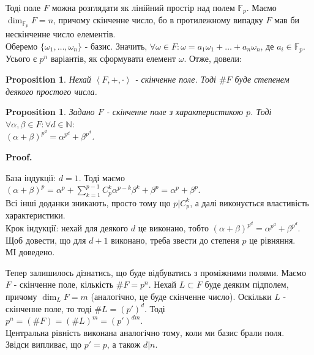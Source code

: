 \documentclass[a4paper, 10pt]{article}
\makeatletter
\theoremstyle{theoremdd}
\theoremstyle{theoremdd}
\theoremstyle{theoremdd}
\theoremstyle{theoremdd}
\theoremstyle{theoremdd}
\newtheorem{proposition}[theorem]{Proposition}
\theoremstyle{theoremdd}
\theoremstyle{theoremdd}
\theoremstyle{theoremdd}
\renewenvironment{proof}[1][Proof.\\]{\par
\pushQED{\hfill \qed}%
\normalfont \topsep6\p@\@plus6\p@\relax
\trivlist
\item\relax
{\bfseries
#1\@addpunct{.}}\hspace\labelsep\ignorespaces
}{%
\popQED\endtrivlist\@endpefalse
}
\makeatother
\begin{document}
Тоді поле $F$ можна розглядати як лінійний простір над полем $\mathbb{F}_p$.  Маємо $\dim_{\mathbb{F}_p} F = n$, причому скінченне число, бо в протилежному випадку $F$ мав би нескінченне число елементів.\\
Оберемо $\{\omega_1,\dots,\omega_n\}$ - базис. Значить, $\forall \omega \in F: \omega = a_1 \omega_1 + \dots + a_n \omega_n$, де $a_i \in \mathbb{F}_p$. Усього є $p^n$ варіантів, як сформувати елемент $\omega$. Отже, довели:

\begin{proposition}
Нехай $\left<F,+,\cdot\right>$ - скінченне поле. Тоді $\# F$ буде степенем деякого простого числа.
\end{proposition}

\begin{proposition}
Задано $F$ - скінченне поле з характеристикою $p$. Тоді $\forall \alpha,\beta \in F: \forall d \in \mathbb{N}:$\\
$(\alpha + \beta)^{p^d} = \alpha^{p^d} + \beta^{p^d}$.
\end{proposition}

\begin{proof}
База індукції: $d = 1$. Тоді маємо\\
$(\alpha+\beta)^p = \alpha^p + \displaystyle\sum_{k=1}^{p-1} C_p^k \alpha^{p-k} \beta^{k} + \beta^p = \alpha^p + \beta^p$.\\
Всі інші доданки зникають, просто тому що $p | C_p^k$, а далі виконується властивість характеристики.\\
Крок індукції: нехай для деякого $d$ це виконано, тобто $(\alpha + \beta)^{p^d} = \alpha^{p^d} + \beta^{p^d}$. Щоб довести, що для $d+1$ виконано, треба звести до степеня $p$ це рівняння.\\

МІ доведено.
\end{proof}

Тепер залишилось дізнатись, що буде відбуватись з проміжними полями.
Маємо $F$ - скінченне поле, кількість $\# F = p^n$. Нехай $L \subset F$ буде деяким підполем, причому $\dim_L F = m$ (аналогічно, це буде скінченне число). Оскільки $L$ - скінченне поле, то тоді $\# L = (p')^d$. Тоді\\
$p^n = (\# F) = (\# L)^m = (p')^{dm}$.\\
Центральна рівність виконана аналогічно тому, коли ми базис брали поля.\\
Звідси випливає, що $p'=p$, а також $d | n$.
\end{document}
